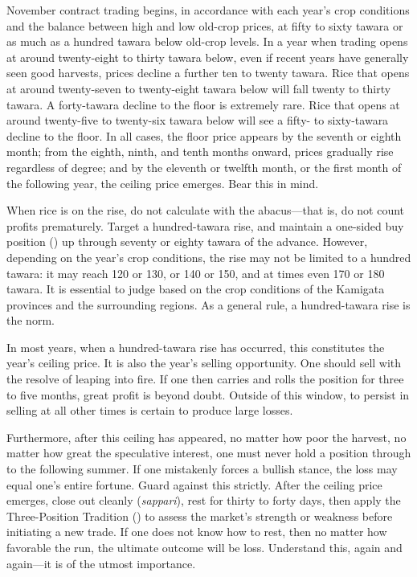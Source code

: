 
\begin{sokyubox}
{\small\itshape\color{sokyubar} }

\medskip
November contract trading begins, in accordance with each year's crop
conditions and the balance between high and low old-crop prices, at fifty
to sixty tawara or as much as a hundred tawara below old-crop levels. In a
year when trading opens at around twenty-eight to thirty tawara below, even
if recent years have generally seen good harvests, prices decline a further
ten to twenty tawara. Rice that opens at around twenty-seven to
twenty-eight tawara below will fall twenty to thirty tawara. A
forty-tawara decline to the floor is extremely rare. Rice that opens at
around twenty-five to twenty-six tawara below will see a fifty- to
sixty-tawara decline to the floor. In all cases, the floor price appears
by the seventh or eighth month; from the eighth, ninth, and tenth months
onward, prices gradually rise regardless of degree; and by the eleventh or
twelfth month, or the first month of the following year, the ceiling price
emerges. Bear this in mind.

When rice is on the rise, do not calculate with the abacus---that is, do
not count profits prematurely. Target a hundred-tawara rise, and maintain
a one-sided buy position () up through seventy or eighty
tawara of the advance. However, depending on the year's crop conditions,
the rise may not be limited to a hundred tawara: it may reach 120 or 130,
or 140 or 150, and at times even 170 or 180 tawara. It is essential to
judge based on the crop conditions of the Kamigata provinces and the
surrounding regions. As a general rule, a hundred-tawara rise is the norm.

In most years, when a hundred-tawara rise has occurred, this constitutes
the year's ceiling price. It is also the year's selling opportunity. One
should sell with the resolve of leaping into fire. If one then carries and
rolls the position for three to five months, great profit is beyond doubt.
Outside of this window, to persist in selling at all other times is certain
to produce large losses.

Furthermore, after this ceiling has appeared, no matter how poor the
harvest, no matter how great the speculative interest, one must never hold
a position through to the following summer. If one mistakenly forces a
bullish stance, the loss may equal one's entire fortune. Guard against
this strictly. After the ceiling price emerges, close out cleanly
(\textit{sappari}), rest for thirty to forty days, then apply the
Three-Position Tradition () to assess the
market's strength or weakness before initiating a new trade. If one does
not know how to rest, then no matter how favorable the run, the ultimate
outcome will be loss. Understand this, again and again---it is of the
utmost importance.
\end{sokyubox}

